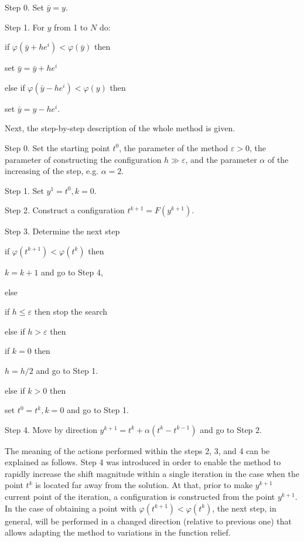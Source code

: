 \documentclass[runningheads]{llncs}
\begin{document}
Step 0. Set $\bar{y} = y$.

Step 1. For $y$ from 1 to $N$ do:

\>\>\>\> if $\varphi(\bar{y} + he^i) < \varphi(\bar{y})$ then 

\>\>\>\>\>\>\>\> set $\bar{y} = \bar{y} + he^i$ 

\>\>\>\> else if $\varphi(\bar{y} - he^i) < \varphi(y)$ then 

\>\>\>\>\>\>\>\> set $\bar{y} = y - he^i.$

Next, the step-by-step description of the whole method is given.

Step 0. Set the starting point $t^0$, the parameter of the method $\varepsilon > 0$, the parameter of constructing the configuration $h\gg\varepsilon$, and the parameter $\alpha$ of the increasing of the step, e.g. $\alpha = 2$.

Step 1. Set $y^1  = t^0, k = 0$.

Step 2. Construct a configuration $t^{k+1} = F(y^{k +1})$.

Step 3. Determine the next step

\>\>\>\> if $\varphi(t^{k + 1}) < \varphi(t^{k})$ then 

\>\>\>\>\>\>\>\> $k = k + 1$ and go to Step 4, 

\>\>\>\> else 

\>\>\>\>\>\>\>\> if $h \leq \varepsilon$ then stop the search 

\>\>\>\>\>\>\>\> else if $h > \varepsilon$ then 

\>\>\>\>\>\>\>\>\>\>\>\> if $k = 0$ then 

\>\>\>\>\>\>\>\>\>\>\>\>\>\>\>\> $h = h / 2$ and go to Step 1. 

\>\>\>\>\>\>\>\>\>\>\>\> else if $k > 0$ then 

\>\>\>\>\>\>\>\>\>\>\>\>\>\>\>\> set $t^0 = t^k, k = 0$ and go to Step 1.

Step 4. Move by direction $y^{k + 1} = t^k + \alpha (t^k - t^{k - 1})$ and go to Step 2.

The meaning of the actions performed within the steps 2, 3, and 4 can be explained as follows. 
Step 4 was introduced in order to enable the method to rapidly increase the shift magnitude within a single iteration in the case when the point $t^k$ is located far away from the solution. At that, prior to make $y^{k+1}$ current point of the iteration, a configuration is constructed from the point $y^{k+1}$. In the case of obtaining a point with $\varphi(t^{k+1})< \varphi(t^k)$, the next step, in general, will be performed in a changed direction (relative to previous one) that allows adapting the method to variations in the function relief.
\end{document}
